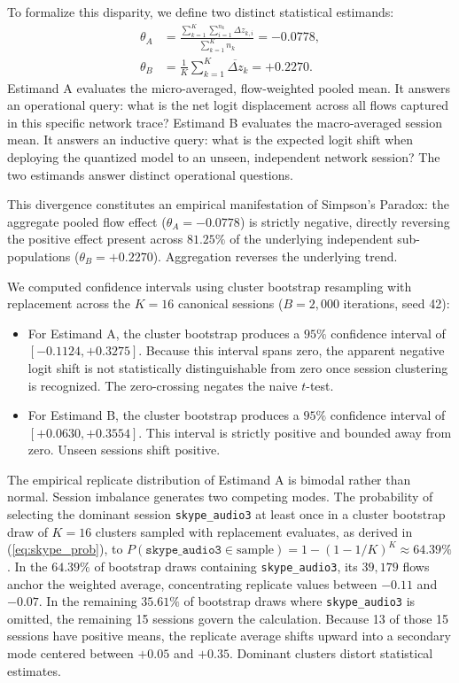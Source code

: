 \documentclass[conference]{IEEEtran}
\begin{document}
To formalize this disparity, we define two distinct statistical estimands:
\begin{align}
\theta_A &= \frac{\sum_{k=1}^K \sum_{i=1}^{n_k} \Delta z_{k,i}}{\sum_{k=1}^K n_k} = -0.0778, \label{eq:estimand_a_eval} \\
\theta_B &= \frac{1}{K} \sum_{k=1}^K \overline{\Delta z}_k = +0.2270. \label{eq:estimand_b_eval}
\end{align}
Estimand A evaluates the micro-averaged, flow-weighted pooled mean. It answers an operational query: what is the net logit displacement across all flows captured in this specific network trace? Estimand B evaluates the macro-averaged session mean. It answers an inductive query: what is the expected logit shift when deploying the quantized model to an unseen, independent network session? The two estimands answer distinct operational questions.

This divergence constitutes an empirical manifestation of Simpson's Paradox: the aggregate pooled flow effect ($\theta_A = -0.0778$) is strictly negative, directly reversing the positive effect present across $81.25\%$ of the underlying independent sub-populations ($\theta_B = +0.2270$). Aggregation reverses the underlying trend.

We computed confidence intervals using cluster bootstrap resampling with replacement across the $K = 16$ canonical sessions ($B = 2,000$ iterations, seed 42):
\begin{itemize}
    \item For Estimand A, the cluster bootstrap produces a $95\%$ confidence interval of $[-0.1124, +0.3275]$. Because this interval spans zero, the apparent negative logit shift is not statistically distinguishable from zero once session clustering is recognized. The zero-crossing negates the naive $t$-test.
    \item For Estimand B, the cluster bootstrap produces a $95\%$ confidence interval of $[+0.0630, +0.3554]$. This interval is strictly positive and bounded away from zero. Unseen sessions shift positive.
\end{itemize}

The empirical replicate distribution of Estimand A is bimodal rather than normal. Session imbalance generates two competing modes. The probability of selecting the dominant session \texttt{skype\_audio3} at least once in a cluster bootstrap draw of $K = 16$ clusters sampled with replacement evaluates, as derived in (\ref{eq:skype_prob}), to $P(\texttt{skype\_audio3} \in \text{sample}) = 1 - (1 - 1/K)^K \approx 64.39\%$.
In the $64.39\%$ of bootstrap draws containing \texttt{skype\_audio3}, its $39,179$ flows anchor the weighted average, concentrating replicate values between $-0.11$ and $-0.07$. In the remaining $35.61\%$ of bootstrap draws where \texttt{skype\_audio3} is omitted, the remaining 15 sessions govern the calculation. Because 13 of those 15 sessions have positive means, the replicate average shifts upward into a secondary mode centered between $+0.05$ and $+0.35$. Dominant clusters distort statistical estimates.
\end{document}
